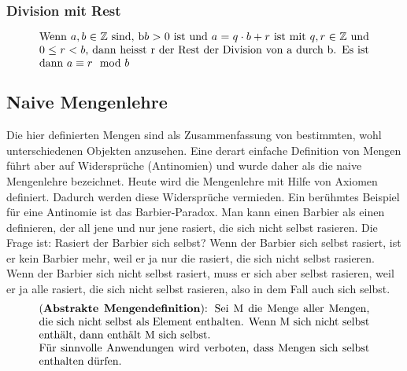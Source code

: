 \documentclass[../Main.tex]{subfiles}
\begin{document}
\subsubsection{Division mit Rest}
\begin{equation}
    \parbox{30em}{Wenn \(a,b \in \mathbb{Z}\) sind, b\(b>0\) ist und \(a=q \cdot b + r\) ist mit \(q,r \in \mathbb{Z}\) und 
    \(0 \leq r < b\), dann heisst r der Rest der Division von a durch b. Es ist dann 
    \(a \equiv r \mod b\)}
\end{equation}

\subsection{Naive Mengenlehre}
Die hier definierten Mengen sind als Zusammenfassung von bestimmten, wohl unterschiedenen Objekten anzusehen. Eine derart einfache Definition von Mengen führt aber auf 
Widersprüche (Antinomien) und wurde daher als die naive Mengenlehre bezeichnet. 
Heute wird die Mengenlehre mit Hilfe von Axiomen definiert. Dadurch werden diese Widersprüche vermieden. Ein berühmtes Beispiel für eine Antinomie ist das Barbier-Paradox.
Man kann einen Barbier als einen definieren, der all jene und nur jene rasiert, die sich nicht selbst rasieren. Die Frage ist: 
Rasiert der Barbier sich selbst? Wenn der Barbier sich selbst rasiert, ist er kein Barbier mehr, weil er ja nur die 
rasiert, die sich nicht selbst rasieren. Wenn der Barbier sich nicht selbst rasiert, muss er sich aber selbst rasieren, weil 
er ja alle rasiert, die sich nicht selbst rasieren, also in dem Fall auch sich selbst.
\begin{equation}
    \parbox{30em}{(\textbf{Abstrakte Mengendefinition}): Sei M die Menge aller Mengen, die 
    sich nicht selbst als Element enthalten. Wenn M sich nicht selbst enthält, dann enthält M
    sich selbst. \\ Für sinnvolle Anwendungen wird verboten, dass Mengen sich selbst enthalten dürfen.}
\end{equation}
\end{document}
